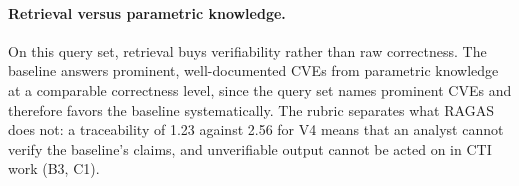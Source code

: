 \begin{table}[H]
    \centering
    \small
    \caption{Ablation effects as deltas between configuration pairs,
             computed from the three-run means of
             Tables~\ref{tab:generation-results}
             and~\ref{tab:rubric-results} (---: metric undefined or
             configuration not rubric-scored; $^{\dagger}$~measurement
             artifact of the relevancy filter,
             Section~\ref{sec:results-generation};
             $\Delta$\,Abst.\ in queries per run)}
    \label{tab:ablation-deltas}
\end{table}

\paragraph{Retrieval versus parametric knowledge.} On this query set,
retrieval buys verifiability rather than raw correctness. The baseline
answers prominent, well-documented CVEs from parametric knowledge at a
comparable correctness level, since the query set names prominent CVEs
and therefore favors the baseline systematically. The rubric separates what RAGAS does
not: a traceability of 1.23 against 2.56 for V4 means that an analyst
cannot verify the baseline's claims, and unverifiable output cannot be
acted on in CTI work (B3, C1).

